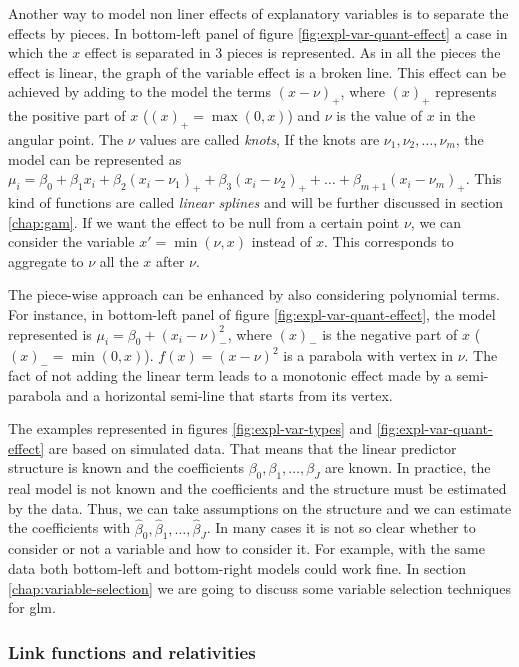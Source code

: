 \documentclass[a4paper, twoside, openright, 12pt]{report}
\theoremstyle{definition}
\theoremstyle{definition}
\theoremstyle{definition}
\theoremstyle{remark}
\begin{document}
Another way to model non liner effects of explanatory variables is to separate the effects by pieces. In bottom-left panel of figure \ref{fig:expl-var-quant-effect} a case in which the \(x\) effect is separated in 3 pieces is represented. As in all the pieces the effect is linear, the graph of the variable effect is a broken line. This effect can be achieved by adding to the model the terms \((x-\nu)_+\), where \((x)_+\) represents the positive part of \(x\) (\((x)_+ = \max(0,x)\)) and \(\nu\) is the value of \(x\) in the angular point. The \(\nu\) values are called \emph{knots}, If the knots are \(\nu_1, \nu_2, \dots, \nu_m\), the model can be represented as \(\mu_i = \beta_0 + \beta_1 x_i + \beta_2 (x_i-\nu_1)_+ + \beta_3 (x_i-\nu_2)_+ + \dots + \beta_{m+1} (x_i-\nu_m)_+\). This kind of functions are called \emph{linear splines} and will be further discussed in section \ref{chap:gam}. If we want the effect to be null from a certain point \(\nu\), we can consider the variable \(x' = \min(\nu, x)\) instead of \(x\). This corresponds to aggregate to \(\nu\) all the \(x\) after \(\nu\).

The piece-wise approach can be enhanced by also considering polynomial terms. For instance, in bottom-left panel of figure \ref{fig:expl-var-quant-effect}, the model represented is \(\mu_i = \beta_0 + \left( x_i - \nu \right)_-^2\), where \((x)_-\) is the negative part of \(x\) (\((x)_- = \min(0,x)\)). \(f(x) = (x-\nu)^2\) is a parabola with vertex in \(\nu\). The fact of not adding the linear term leads to a monotonic effect made by a semi-parabola and a horizontal semi-line that starts from its vertex.

The examples represented in figures \ref{fig:expl-var-types} and \ref{fig:expl-var-quant-effect} are based on simulated data. That means that the linear predictor structure is known and the coefficients \(\beta_0, \beta_1, \dots, \beta_J\) are known. In practice, the real model is not known and the coefficients and the structure must be estimated by the data. Thus, we can take assumptions on the structure and we can estimate the coefficients with \(\hat{\beta}_0, \hat{\beta}_1, \dots, \hat{\beta}_J\). In many cases it is not so clear whether to consider or not a variable and how to consider it. For example, with the same data both bottom-left and bottom-right models could work fine. In section \ref{chap:variable-selection} we are going to discuss some variable selection techniques for \ac{glm}.

\hypertarget{link-functions-and-relativities}{%
\subsubsection{Link functions and relativities}\label{link-functions-and-relativities}}
\end{document}
